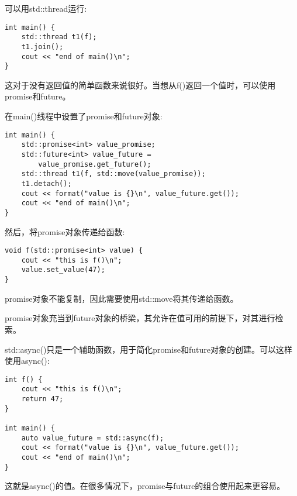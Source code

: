 可以用std::thread运行:

\begin{lstlisting}[style=styleCXX]
int main() {
	std::thread t1(f);
	t1.join();
	cout << "end of main()\n";
}
\end{lstlisting}

这对于没有返回值的简单函数来说很好。当想从f()返回一个值时，可以使用promise和future。

在main()线程中设置了promise和future对象:

\begin{lstlisting}[style=styleCXX]
int main() {
	std::promise<int> value_promise;
	std::future<int> value_future =
		value_promise.get_future();
	std::thread t1(f, std::move(value_promise));
	t1.detach();
	cout << format("value is {}\n", value_future.get());
	cout << "end of main()\n";
}
\end{lstlisting}

然后，将promise对象传递给函数:

\begin{lstlisting}[style=styleCXX]
void f(std::promise<int> value) {
	cout << "this is f()\n";
	value.set_value(47);
}
\end{lstlisting}

promise对象不能复制，因此需要使用std::move将其传递给函数。

promise对象充当到future对象的桥梁，其允许在值可用的前提下，对其进行检索。

std::async()只是一个辅助函数，用于简化promise和future对象的创建。可以这样使用async():

\begin{lstlisting}[style=styleCXX]
int f() {
	cout << "this is f()\n";
	return 47;
}

int main() {
	auto value_future = std::async(f);
	cout << format("value is {}\n", value_future.get());
	cout << "end of main()\n";
}
\end{lstlisting}

这就是async()的值。在很多情况下，promise与future的组合使用起来更容易。

















